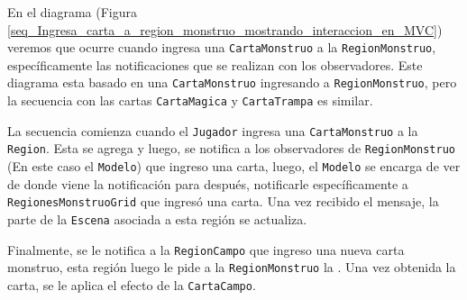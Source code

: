 	En el diagrama (Figura \ref{seq_Ingresa_carta_a_region_monstruo_mostrando_interaccion_en_MVC}) veremos que ocurre cuando ingresa una \texttt{CartaMonstruo} a la \texttt{RegionMonstruo}, específicamente las notificaciones que se realizan con los observadores. Este diagrama esta basado en una \texttt{CartaMonstruo} ingresando a \texttt{RegionMonstruo}, pero la secuencia con las cartas \texttt{CartaMagica} y \texttt{CartaTrampa} es similar.
	
	La secuencia comienza cuando el \texttt{Jugador} ingresa una \texttt{CartaMonstruo} a la \texttt{Region}. Esta se agrega y luego, se notifica a los observadores de \texttt{RegionMonstruo} (En este caso el \texttt{Modelo}) que ingreso una carta, luego, el \texttt{Modelo} se encarga de ver de donde viene la notificación para después, notificarle específicamente a \texttt{RegionesMonstruoGrid} que ingresó una carta. Una vez recibido el mensaje, la parte de la \texttt{Escena} asociada a esta región se actualiza.
	
	Finalmente, se le notifica a la \texttt{RegionCampo} que ingreso una nueva carta monstruo, esta región luego le pide a la \texttt{RegionMonstruo} la . Una vez obtenida la carta, se le aplica el efecto de la \texttt{CartaCampo}.
	

